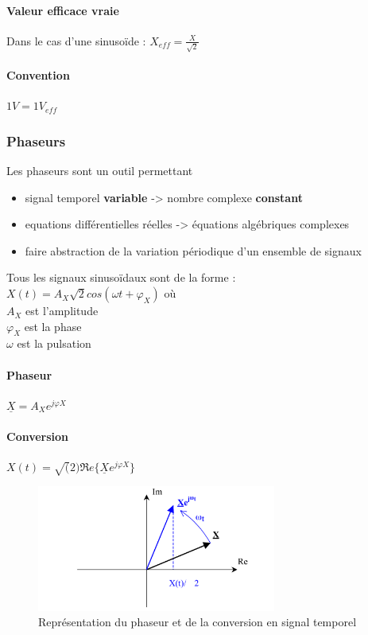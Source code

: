 \documentclass[a4paper]{article}
\begin{document}
            \paragraph{Valeur efficace vraie}
                Dans le cas d'une sinusoïde : $ X_{eff} = \frac{X}{\sqrt{2}} $
            \paragraph{Convention}
                $ 1V = 1V_{eff} $

        \subsubsection{Phaseurs}
            Les phaseurs sont un outil permettant
            \begin{itemize}
                \item signal temporel \textbf{variable} -> nombre complexe \textbf{constant}
                \item equations différentielles réelles -> équations algébriques complexes
                \item faire abstraction de la variation périodique d'un ensemble de signaux
            \end{itemize}
            Tous les signaux sinusoïdaux sont de la forme : \\
            $ X(t) = A_{X}\sqrt{2}cos(\omega t + \varphi_{X}) $ où \\
            $ A_{X} $ est l'amplitude \\
            $ \varphi_{X} $ est la phase \\
            $ \omega $ est la pulsation \\
            \paragraph{Phaseur} $ \underline{X} = A_{X}e^{j \varphi X} $
            \paragraph{Conversion} $ X(t) = \sqrt(2)\Re e\{\underline{X}e^{j \varphi X}\} $
            \begin{figure}[H]
                \begin{center}
                    \includegraphics[width=0.7\textwidth]{fig/2_phaseur.png}
                    \caption{Représentation du phaseur et de la conversion en signal temporel}
                    \label{fig:2_superposition}
                \end{center}
            \end{figure}
\end{document}
